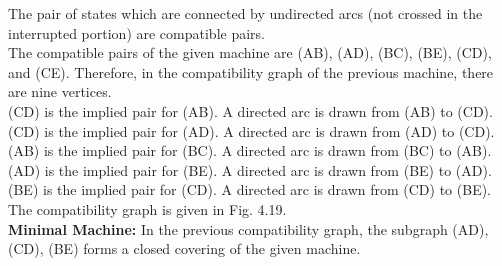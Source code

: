 \documentclass[9pt]{beamer}
\begin{document}
\begin{frame}
\hspace*{0.2cm} The pair of states which are connected by undirected
arcs (not crossed in the interrupted portion) are compatible
pairs.\\

\hspace*{0.2cm} The compatible pairs of the given machine are (AB),
(AD), (BC), (BE), (CD), and (CE). Therefore, in the
compatibility graph of the previous machine, there are
nine vertices.\\

\hspace*{0.2cm} (CD) is the implied pair for (AB). A directed arc is
drawn from (AB) to (CD).\\

\hspace*{0.2cm} (CD) is the implied pair for (AD). A directed arc is
drawn from (AD) to (CD).\\

\hspace*{0.2cm} (AB) is the implied pair for (BC). A directed arc is
drawn from (BC) to (AB).\\

\hspace*{0.2cm} (AD) is the implied pair for (BE). A directed arc is
drawn from (BE) to (AD).\\

(BE) is the implied pair for (CD). A directed arc is
drawn from (CD) to (BE).\\

\hspace*{0.2cm} The compatibility graph is given in Fig. 4.19.\\

\vspace*{0.2cm}
\pause
\textbf{Minimal Machine:} In the previous compatibility graph, the subgraph (AD), (CD), (BE) forms a closed
covering of the given machine.
\end{frame}
\end{document}
